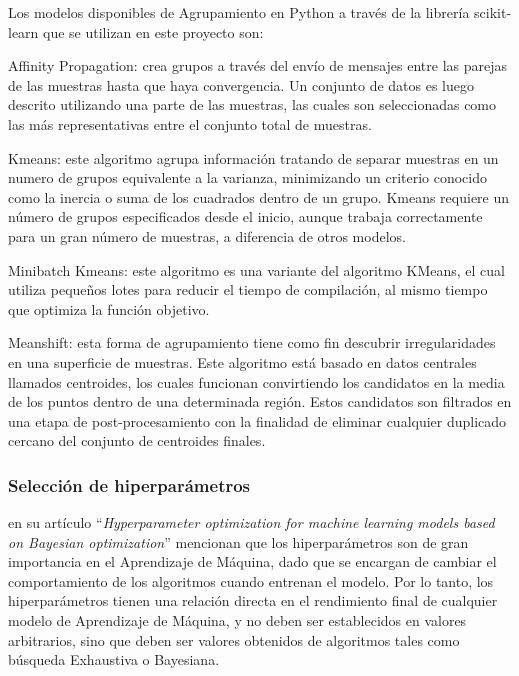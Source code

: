 Los modelos disponibles de Agrupamiento en Python a través de la librería scikit-learn \parencite{sklearn_api} que se utilizan en este proyecto son:

\begin{APAitemize}
    \item Affinity Propagation: crea grupos a través del envío de mensajes entre las parejas de las muestras hasta que haya convergencia. Un conjunto de datos es luego descrito utilizando una parte de las muestras, las cuales son seleccionadas como las más representativas entre el conjunto total de muestras.
    \item Kmeans: este algoritmo agrupa información tratando de separar muestras en un numero de grupos equivalente a la varianza, minimizando un criterio conocido como la inercia o suma de los cuadrados dentro de un grupo. Kmeans requiere un número de grupos especificados desde el inicio, aunque trabaja correctamente para un gran número de muestras, a diferencia de otros modelos.
    \item Minibatch Kmeans: este algoritmo es una variante del algoritmo KMeans, el cual utiliza pequeños lotes para reducir el tiempo de compilación, al mismo tiempo que optimiza la función objetivo.
    \item Meanshift: esta forma de agrupamiento tiene como fin descubrir irregularidades en una superficie de muestras. Este algoritmo está basado en datos centrales llamados centroides, los cuales funcionan convirtiendo los candidatos en la media de los puntos dentro de una determinada región. Estos candidatos son filtrados en una etapa de post-procesamiento con la finalidad de eliminar cualquier duplicado cercano del conjunto de centroides finales.
\end{APAitemize}

\subsubsection{Selección de hiperparámetros}
\textcite{Wu2019} en su artículo \enquote{\textit{Hyperparameter optimization for machine learning models based on Bayesian optimization}} mencionan que los hiperparámetros son de gran importancia en el Aprendizaje de Máquina, dado que se encargan de cambiar el comportamiento de los algoritmos cuando entrenan el modelo. Por lo tanto, los hiperparámetros tienen una relación directa en el rendimiento final de cualquier modelo de Aprendizaje de Máquina, y no deben ser establecidos en valores arbitrarios, sino que deben ser valores obtenidos de algoritmos tales como búsqueda Exhaustiva o Bayesiana.

